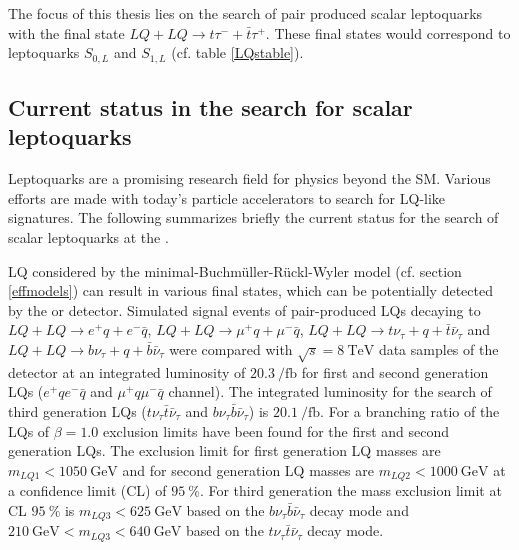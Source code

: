 %
The focus of this thesis lies on the search of pair produced scalar leptoquarks with the final state $LQ+LQ\rightarrow t\tau^{-}+\bar{t}\tau^{+}$. These final states would correspond to leptoquarks $S_{0,L}$ and $S_{1,L}$ (cf. table \ref{LQstable}). 
%
%
%
\subsection{Current status in the search for scalar leptoquarks}\label{currentStatus}
Leptoquarks are a promising research field for physics beyond the SM. Various efforts are made with today's particle accelerators to search for LQ-like signatures. The following summarizes briefly the current status for the search of scalar leptoquarks at the {\LHC}.\par
LQ considered by the minimal-Buchm\"{u}ller-R\"{u}ckl-Wyler model (cf. section \ref{effmodels}) can result in various final states, which can be potentially detected by the {\ATLAS} or {\CMS} detector.\newline
Simulated signal events of pair-produced LQs decaying to $LQ+LQ\rightarrow e^+q+e^-\bar{q}$, $LQ+LQ\rightarrow \mu^+q+\mu^-\bar{q}$, $LQ+LQ\rightarrow t\nu_\tau+q+\bar{t}\bar{\nu}_\tau$ and $LQ+LQ\rightarrow b\nu_\tau+q+\bar{b}\bar{\nu}_\tau$ were compared with $\sqrt{s}=\SI{8}{\tera\electronvolt}$ data samples of the {\ATLAS} detector at an integrated luminosity of $\SI{20.3}{\per\femto\barn}$ for first and second generation LQs ($e^+qe^-\bar{q}$ and $\mu^+q\mu^-\bar{q}$ channel). The integrated luminosity for the search of third generation LQs ($t\nu_\tau\bar{t}\bar{\nu}_\tau$ and $b\nu_\tau\bar{b}\bar{\nu}_\tau$) is $\SI{20.1}{\per\femto\barn}$. \cite{currentStatus:8TeVATLAS} For a branching ratio of the LQs of $\beta=1.0$ exclusion limits have been found for the first and second generation LQs. The exclusion limit for first generation LQ masses are $m_{LQ1}<\SI{1050}{\giga\electronvolt}$ and for second generation LQ masses are $m_{LQ2}<\SI{1000}{\giga\electronvolt}$ at a confidence limit (CL) of $\SI{95}{\percent}$. For third generation the mass exclusion limit at CL $\SI{95}{\percent}$ is $m_{LQ3}<\SI{625}{\giga\electronvolt}$ based on the $b\nu_\tau\bar{b}\bar{\nu}_\tau$ decay mode and $\SI{210}{\giga\electronvolt}<m_{LQ3}<\SI{640}{\giga\electronvolt}$ based on the $t\nu_\tau\bar{t}\bar{\nu}_\tau$ decay mode. \cite{currentStatus:8TeVATLAS}\par
